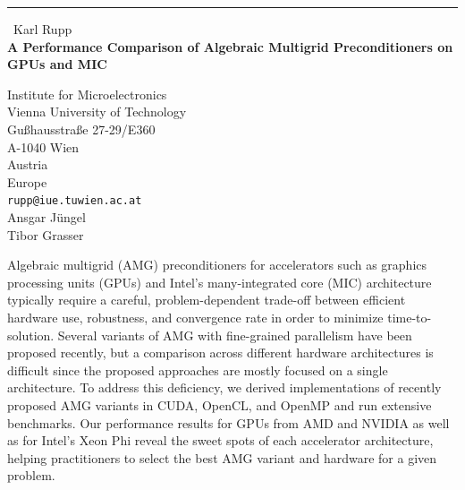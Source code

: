 \documentclass{report}
\begin{document}
\begin{center}
\rule{6in}{1pt} \
{\large Karl Rupp \\
{\bf A Performance Comparison of Algebraic Multigrid Preconditioners on GPUs and MIC}}

Institute for Microelectronics \\ Vienna University of Technology \\ Gu\ss{}hausstra\ss{}e 27-29/E360 \\ A-1040 Wien \\ Austria \\ Europe
\\
{\tt rupp@iue.tuwien.ac.at}\\
Ansgar J\"ungel\\
Tibor Grasser\end{center}

Algebraic multigrid (AMG) preconditioners for accelerators such as
graphics processing units (GPUs) and Intel's many-integrated core (MIC)
architecture typically require a careful, problem-dependent trade-off
between efficient hardware use, robustness, and convergence rate in order
to minimize time-to-solution. Several variants of AMG with fine-grained
parallelism have been proposed recently, but a comparison across
different hardware architectures is difficult since the proposed
approaches are mostly focused on a single architecture. To address this
deficiency, we derived implementations of recently proposed AMG variants
in CUDA, OpenCL, and OpenMP and run extensive benchmarks. Our performance
results for GPUs from AMD and NVIDIA as well as for Intel's Xeon Phi
reveal the sweet spots of each accelerator architecture, helping
practitioners to select the best AMG variant and hardware for a given
problem.
\end{document}
